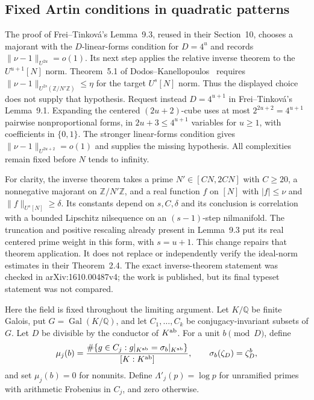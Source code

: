 \subsection{Fixed Artin conditions in quadratic patterns}
\label{subsec:v5-artin-transfer}

\begin{remark}
\label{rem:v5-ft-norm-repair}
The proof of Frei--Tinkov\'a's Lemma~9.3, reused in their Section~10,
chooses a majorant with the $D$-linear-forms condition for $D=4^u$ and
records $\|\nu-1\|_{U^{2u}}=o(1)$. Its next step applies the relative
inverse theorem to the $U^{u+1}[N]$ norm. Theorem~5.1 of
Dodos--Kanellopoulos~\cite{v5dk} requires
$\|\nu-1\|_{U^{2s}(\mathbb Z/N'\mathbb Z)}\leq\eta$ for the target
$U^s[N]$ norm. Thus the displayed choice does not supply that hypothesis.
Request instead $D=4^{u+1}$ in Frei--Tinkov\'a's Lemma~9.1. Expanding the
centered $(2u+2)$-cube uses at most $2^{2u+2}=4^{u+1}$ pairwise
nonproportional forms, in $2u+3\leq4^{u+1}$ variables for $u\geq1$,
with coefficients in $\{0,1\}$. The stronger linear-forms condition gives
$\|\nu-1\|_{U^{2u+2}}=o(1)$ and supplies the missing hypothesis.
All complexities remain fixed before $N$ tends to infinity.

For clarity, the inverse theorem takes a prime $N'\in[CN,2CN]$ with
$C\geq20$, a nonnegative majorant on $\mathbb Z/N'\mathbb Z$, and a real
function $f$ on $[N]$ with $|f|\leq\nu$ and $\|f\|_{U^s[N]}\geq\delta$.
Its constants depend on $s,C,\delta$ and its conclusion is correlation
with a bounded Lipschitz nilsequence on an $(s-1)$-step nilmanifold.
The truncation and positive rescaling already present in Lemma~9.3
put its real centered prime weight in this form, with $s=u+1$.
This change repairs that theorem application. It does not replace or
independently verify the ideal-norm estimates in their Theorem~2.4.
The exact inverse-theorem statement was checked in arXiv:1610.00487v4;
the work is published, but its final typeset statement was not compared.
\end{remark}

Here the field is fixed throughout the limiting argument. Let $K/\mathbb Q$
be finite Galois, put $G=\operatorname{Gal}(K/\mathbb Q)$, and let
$C_1,\ldots,C_k$ be conjugacy-invariant subsets of $G$.
Let $D$ be divisible by the conductor of $K^{\rm ab}$.
For a unit $b\pmod D$, define
\begin{equation}\label{eq:v5-mu}
 \mu_j(b)=\frac{\#\{g\in C_j:g|_{K^{\rm ab}}=\sigma_b|_{K^{\rm ab}}\}}
                  {[K:K^{\rm ab}]},
 \qquad \sigma_b(\zeta_D)=\zeta_D^b,
\end{equation}
and set $\mu_j(b)=0$ for nonunits. Define $\Lambda'_j(p)=\log p$ for
unramified primes with arithmetic Frobenius in $C_j$, and zero otherwise.

